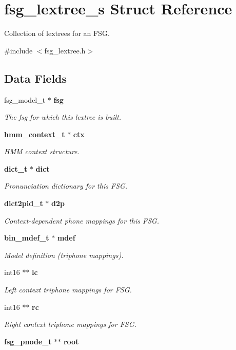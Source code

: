 \section{fsg\-\_\-lextree\-\_\-s Struct Reference}
\label{structfsg__lextree__s}


Collection of lextrees for an F\-S\-G.  




{\ttfamily \#include $<$fsg\-\_\-lextree.\-h$>$}

\subsection*{Data Fields}
\begin{DoxyCompactItemize}
\item 
fsg\-\_\-model\-\_\-t $\ast$ {\bf fsg}
\begin{DoxyCompactList}\small\item\em The fsg for which this lextree is built. \end{DoxyCompactList}\item 
{\bf hmm\-\_\-context\-\_\-t} $\ast$ {\bf ctx}
\begin{DoxyCompactList}\small\item\em H\-M\-M context structure. \end{DoxyCompactList}\item 
{\bf dict\-\_\-t} $\ast$ {\bf dict}
\begin{DoxyCompactList}\small\item\em Pronunciation dictionary for this F\-S\-G. \end{DoxyCompactList}\item 
{\bf dict2pid\-\_\-t} $\ast$ {\bf d2p}
\begin{DoxyCompactList}\small\item\em Context-\/dependent phone mappings for this F\-S\-G. \end{DoxyCompactList}\item 
{\bf bin\-\_\-mdef\-\_\-t} $\ast$ {\bf mdef}
\begin{DoxyCompactList}\small\item\em Model definition (triphone mappings). \end{DoxyCompactList}\item 
int16 $\ast$$\ast$ {\bf lc}
\begin{DoxyCompactList}\small\item\em Left context triphone mappings for F\-S\-G. \end{DoxyCompactList}\item 
int16 $\ast$$\ast$ {\bf rc}
\begin{DoxyCompactList}\small\item\em Right context triphone mappings for F\-S\-G. \end{DoxyCompactList}\item 
{\bf fsg\-\_\-pnode\-\_\-t} $\ast$$\ast$ {\bfseries root}\label{structfsg__lextree__s_a12e9668f7da3b84b0b36799a631fe8d3}


\end{DoxyCompactItemize}

